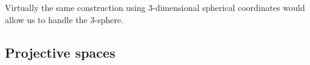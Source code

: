 \documentclass[12pt]{amsart}
\newtheorem{prop}{Proposition}
\begin{document}
Virtually the same construction using $3$-dimensional spherical coordinates would allow us to handle the $3$-sphere.

\subsection{Projective spaces}






\end{document}
